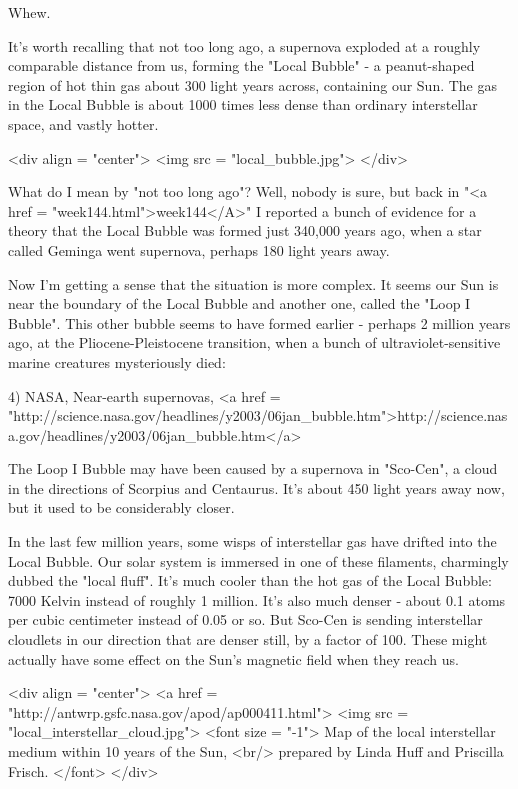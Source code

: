 Whew.

It's worth recalling that not too long ago, a supernova exploded at a
roughly comparable distance from us, forming the "Local Bubble" - a
peanut-shaped region of hot thin gas about 300 light years across,
containing our Sun.  The gas in the Local Bubble is about 1000 times 
less dense than ordinary interstellar space, and vastly hotter.  

<div align = "center">
<img src = "local_bubble.jpg">
</div>


What do I mean by "not too long ago"?  Well, nobody is sure,
but back in "<a href = "week144.html">week144</A>" I
reported a bunch of evidence for a theory that the Local Bubble was
formed just 340,000 years ago, when a star called Geminga went
supernova, perhaps 180 light years away.

Now I'm getting a sense that the situation is more complex.  It seems
our Sun is near the boundary of the Local Bubble and another one,
called the "Loop I Bubble".  This other bubble seems to have formed
earlier - perhaps 2 million years ago, at the Pliocene-Pleistocene 
transition, when a bunch of ultraviolet-sensitive marine creatures 
mysteriously died:

4) NASA, Near-earth supernovas,
<a href = "http://science.nasa.gov/headlines/y2003/06jan_bubble.htm">http://science.nasa.gov/headlines/y2003/06jan_bubble.htm</a>

The Loop I Bubble may have been caused by a supernova in "Sco-Cen", 
a cloud in the directions of Scorpius and Centaurus.  It's about 
450 light years away now, but it used to be considerably closer.

In the last few million years, some wisps of interstellar gas have
drifted into the Local Bubble.  Our solar system is immersed in one of
these filaments, charmingly dubbed the "local fluff".  
It's much cooler than the hot gas of the Local Bubble: 7000 Kelvin instead
of roughly 1 million.  It's also much denser - about 0.1 atoms per
cubic centimeter instead of 0.05 or so.  But Sco-Cen is sending
interstellar cloudlets in our direction that are denser still, by a
factor of 100.  These might actually have some effect on the Sun's
magnetic field when they reach us.

<div align = "center">
<a href = "http://antwrp.gsfc.nasa.gov/apod/ap000411.html">
<img src = "local_interstellar_cloud.jpg">
<font size = "-1">
Map of the local interstellar medium within 10 years of the Sun, <br/>
prepared by Linda Huff and Priscilla Frisch.
</font>
</div>

